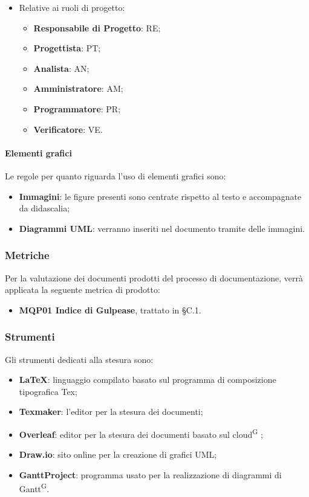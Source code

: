 \begin{itemize}
\begin{itemize}
    \item Relative ai ruoli di progetto:
        \begin{itemize}
        \item \textbf{Responsabile di Progetto}: RE;
        \item \textbf{Progettista}: PT;
        \item \textbf{Analista}: AN;
        \item \textbf{Amministratore}: AM;
        \item \textbf{Programmatore}: PR;
        \item \textbf{Verificatore}: VE.
        \end{itemize}
    \end{itemize}
\end{itemize}

\paragraph{Elementi grafici}
Le regole per quanto riguarda l’uso di elementi grafici sono:
\begin{itemize}
\item \textbf{Immagini}: le figure presenti sono centrate rispetto al testo e accompagnate da didascalia;
\item \textbf{Diagrammi UML}: verranno inseriti nel documento tramite delle immagini.
\end{itemize}

\subsubsection{Metriche}
Per la valutazione dei documenti prodotti del processo di documentazione, verrà applicata la seguente metrica di prodotto:
\begin{itemize}
\item \textbf{MQP01 Indice di Gulpease}, trattato in §C.1. 
\end{itemize}

\subsubsection{Strumenti}
Gli strumenti dedicati alla stesura sono:
\begin{itemize}
\item \textbf{\LaTeX}: linguaggio compilato basato sul programma di composizione tipografica Tex;
\item \textbf{Texmaker}: l’editor per la stesura dei documenti;
\item \textbf{Overleaf}: editor per la stesura dei documenti basato sul cloud\textsuperscript{G} ;
\item \textbf{Draw.io}: sito online per la creazione di grafici UML;
\item \textbf{GanttProject}: programma usato per la realizzazione di diagrammi di Gantt\textsuperscript{G}.
\end{itemize}

